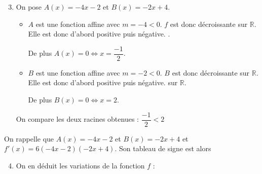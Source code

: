 \documentclass[15pt, mathserif]{beamer}
\begin{document}
 \begin{frame} 
 
 \begin{enumerate} 
 \setcounter{enumi}{2} 
 
 	 \item On pose $A(x)= -4x-2$ et $B(x) = -2x+4$.
 \bigskip 
 \begin{itemize}
	\item $A$ est une fonction affine avec $m =-4<0$. $f$ est donc décroissante sur $\mathbb{R}$. Elle est donc d'abord positive puis négative. .

	 De plus $A(x) = 0 \Leftrightarrow x = \dfrac{-1}{2}$. 
 \bigskip 
	\item $B$ est une fonction affine avec $m =-2<0$. $B$ est donc décroissante sur $\mathbb{R}$. Elle est donc d'abord positive puis négative. sur $\mathbb{R}$.

	 De plus $B(x) = 0 \Leftrightarrow x = 2$.
\end{itemize}
 On compare les deux racines obtenues : $ \dfrac{-1}{2} < 2$ 
 \end{enumerate} 
 
 \end{frame}


\begin{frame}On rappelle que $A(x) = -4x-2$ et $B(x) = -2x+4$ et $f'(x) = 6(-4x-2)(-2x+4)$. Son tableau de signe est alors 

\medskip \hfil
{}

 \begin{enumerate} 
 \setcounter{enumi}{3} 
 	 \item On en déduit les variations de la fonction $f$ : 

  \medskip \hfil
{}

 \end{enumerate} 
 
\end{frame}
\end{document}
